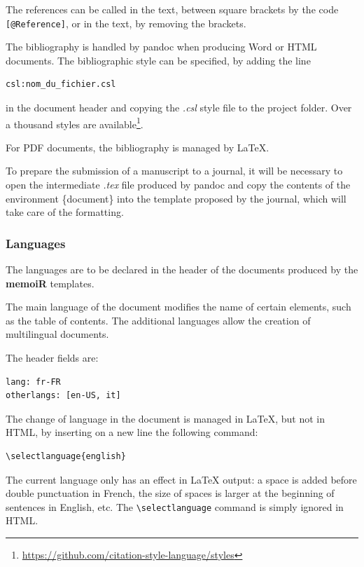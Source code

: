 \documentclass[
  12pt,
  american,
  a4paper,
  extrafontsizes,onecolumn,openright
  ]{memoir}
\begin{document}
The references can be called in the text, between square brackets by the code \texttt{{[}@Reference{]}}, or in the text, by removing the brackets.

The bibliography is handled by pandoc when producing Word or HTML documents.
The bibliographic style can be specified, by adding the line

\begin{verbatim}
csl:nom_du_fichier.csl
\end{verbatim}

in the document header and copying the \emph{.csl} style file to the project folder.
Over a thousand styles are available\footnote{\url{https://github.com/citation-style-language/styles}}.

For PDF documents, the bibliography is managed by LaTeX.

To prepare the submission of a manuscript to a journal, it will be necessary to open the intermediate \emph{.tex} file produced by pandoc and copy the contents of the environment \{document\} into the template proposed by the journal, which will take care of the formatting.

\hypertarget{languages}{%
\subsubsection{Languages}\label{languages}}

The languages are to be declared in the header of the documents produced by the \textbf{memoiR} templates.

The main language of the document modifies the name of certain elements, such as the table of contents.
The additional languages allow the creation of multilingual documents.

The header fields are:

\begin{verbatim}
lang: fr-FR
otherlangs: [en-US, it]
\end{verbatim}

The change of language in the document is managed in LaTeX, but not in HTML, by inserting on a new line the following command:

\begin{verbatim}
\selectlanguage{english}
\end{verbatim}

The current language only has an effect in LaTeX output: a space is added before double punctuation in French, the size of spaces is larger at the beginning of sentences in English, etc.
The \texttt{\textbackslash{}selectlanguage} command is simply ignored in HTML.
\end{document}
